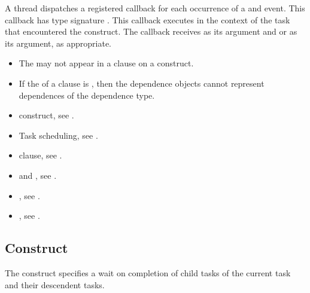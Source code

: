A thread dispatches a registered
 callback
for each occurrence of a  and  event.
This callback has type signature .
This callback executes in the context of the task that encountered the
 construct. The callback receives
 as its  argument and
 or 
as its  argument, as appropriate.

\restrictions

\begin{itemize}
 \item The   may not appear in a
 clause on a  construct.
 \item If the  of a  clause is , then the dependence
 objects cannot represent dependences of the 
  dependence type.
\end{itemize}

\crossreferences
\begin{itemize}
\item {} construct, see .

\item Task scheduling, see
.

\item {} clause, see .

\item {} and , see
.

\item {}, see
.

\item {}, see
.

\end{itemize}







\subsection{ Construct}
\label{subsec:taskgroup Construct}
\summary
The  construct specifies a wait on completion of child tasks of the current
task and their descendent tasks.

